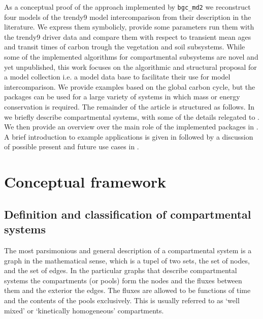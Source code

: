 As a conceptual proof of the  approach implemented by \texttt{bgc\_md2}
we reconstruct four models of the trendy9 model intercomparison from their description in the literature.
We express them symbolicly, provide some parameters run them with the trendy9 driver data and
compare them with respect to transient mean ages and transit times of carbon
trough the vegetation and soil subsystems.  
While some of the implemented algorithms for compartmental subsystems are novel 
and yet unpublished, this work focuses on the algorithmic and structural proposal for a model collection
i.e. a model data base to facilitate their use for model intercomparison. 
We provide examples based on the global carbon cycle, but the
packages can be used for a large variety of systems in which mass or energy
conservation is required.
The remainder of the article is structured as follows.
In  we briefly describe compartmental systems, with some of the details
relegated to .
We then provide an overview over the main role of the implemented packages in 
. A brief introduction to example applications is given in  followed by a discussion of possible present and future use cases in .




\section{Conceptual framework}
\label{sec:ConceptualFramework}
\subsection{Definition and classification of compartmental systems} 
The most parsimonious and general description of a compartmental system is a graph in
the mathematical sense, which is a tupel of two sets, the set of nodes, and the
set of edges.  In the particular graphs that describe compartmental systems the
compartments (or pools) form the nodes and the fluxes between them and the
exterior the edges.  The fluxes are allowed to be functions of time and the
contents of the pools exclusively. This is usually referred to as `well mixed' or
`kinetically homogeneous' compartments.  

